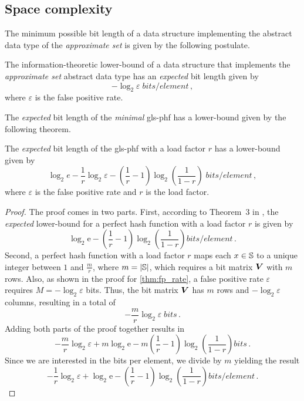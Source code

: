 \documentclass[ ../main.tex]{subfiles}
\begin{document}
\subsection{Space complexity}
The minimum possible bit length of a data structure implementing the abstract data type of the \emph{approximate set} is given by the following postulate.
\begin{postulate}
\label{pst:approx_l_b}
The information-theoretic lower-bound of a data structure that implements the \emph{approximate set} abstract data type has an \emph{expected} bit length given by
\begin{equation}
    -\log_2 \varepsilon \; \si{bits \per element}\,,
\end{equation}
where $\varepsilon$ is the false positive rate.
\end{postulate}

The \emph{expected} bit length of the \emph{minimal} \gls{gls-phf} has a lower-bound given by the following theorem.
\begin{theorem}
\label{thm:mPHF_size}
The \emph{expected} bit length of the \gls{gls-phf} with a load factor $r$ has a lower-bound given by
\begin{equation}
\label{eq:mPHF_size}
    \log_2 e - \frac{1}{r} \log_2 \varepsilon - \left(\frac{1}{r} - 1\right) \log_2\left(\frac{1}{1-r}\right)\; \si{bits \per element}\,,
\end{equation}
where $\varepsilon$ is the false positive rate and $r$ is the load factor.
\end{theorem}
\begin{proof}
The proof comes in two parts. First, according to Theorem~3 in \cite{oph}, the \emph{expected} lower-bound for a perfect hash function with a load factor $r$ is given by
\begin{equation}
    \log_2 \mathrm{e} - \left(\frac{1}{r} - 1\right) \log_2\!\left(\frac{1}{1-r}\right) \si{bits \per element}\,.
\end{equation}
Second, a perfect hash function with a load factor $r$ maps each $x \in \mathbb{S}$ to a unique integer between $1$ and $\frac{m}{r}$, where $m=\left\vert{\mathbb{S}}\right\vert$, which requires a bit matrix $\boldsymbol{V}$ with $m$ rows. Also, as shown in the proof for \cref{thm:fp_rate}, a false positive rate $\varepsilon$ requires $M = -\log_2 \varepsilon$ bits. Thus, the bit matrix $\boldsymbol{V}$ has $m$ rows and $-\log_2 \varepsilon$ columns, resulting in a total of
\begin{equation}
    -\frac{m}{r} \log_2 \varepsilon \; \si{bits}\,.
\end{equation}
Adding both parts of the proof together results in
\begin{equation}
    -\frac{m}{r} \log_2 \varepsilon + m \log_2 \mathrm{e} - m \left(\frac{1}{r} - 1\right) \log_2\!\left(\frac{1}{1-r}\right) \si{bits}\,.
\end{equation}
Since we are interested in the bits per element, we divide by $m$ yielding the result
\begin{equation}
    -\frac{1}{r} \log_2 \varepsilon + \log_2 \mathrm{e} -  \left(\frac{1}{r} - 1\right) \log_2\!\left(\frac{1}{1-r}\right) \si{bits \per element}\,.
\end{equation}
\end{proof}
\end{document}
